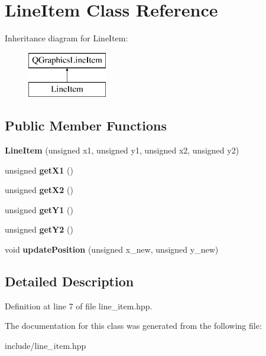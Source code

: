 \hypertarget{classLineItem}{}\section{Line\+Item Class Reference}
\label{classLineItem}
Inheritance diagram for Line\+Item\+:\begin{figure}[H]
\begin{center}
\leavevmode
\includegraphics[height=2.000000cm]{classLineItem}
\end{center}
\end{figure}
\subsection*{Public Member Functions}
\begin{DoxyCompactItemize}
\item 
\mbox{\label{classLineItem_af79b99800cc44a69b53940bdb88ddd1b}} 
{\bfseries Line\+Item} (unsigned x1, unsigned y1, unsigned x2, unsigned y2)
\item 
\mbox{\label{classLineItem_a8862ea60a3804d346e9801f79c67af76}} 
unsigned {\bfseries get\+X1} ()
\item 
\mbox{\label{classLineItem_addce0ef5af72c233e2c7bf019c7a693d}} 
unsigned {\bfseries get\+X2} ()
\item 
\mbox{\label{classLineItem_abbdf5be2637561802ea22385c7c11df5}} 
unsigned {\bfseries get\+Y1} ()
\item 
\mbox{\label{classLineItem_aa99afab282d1e7e25b5d1549a41984d2}} 
unsigned {\bfseries get\+Y2} ()
\item 
\mbox{\label{classLineItem_acea090c7b9ff53dcc7a95ab7939b2cb9}} 
void {\bfseries update\+Position} (unsigned x\+\_\+new, unsigned y\+\_\+new)
\end{DoxyCompactItemize}


\subsection{Detailed Description}


Definition at line 7 of file line\+\_\+item.\+hpp.



The documentation for this class was generated from the following file\+:\begin{DoxyCompactItemize}
\item 
include/line\+\_\+item.\+hpp\end{DoxyCompactItemize}
